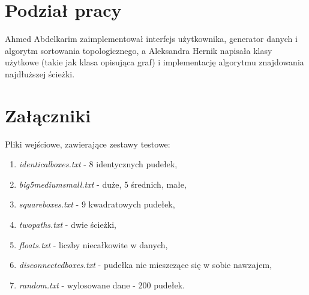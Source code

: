 \documentclass{article}
\begin{document}
\section{Podział pracy}
Ahmed Abdelkarim zaimplementował interfejs użytkownika, generator danych i algorytm sortowania topologicznego, a Aleksandra Hernik napisała klasy użytkowe (takie jak klasa opisująca graf) i implementację algorytmu znajdowania najdłuższej ścieżki.

\section{Załączniki}
Pliki wejściowe, zawierające zestawy testowe:
\begin{enumerate}
\item \textit{identical\textunderscore boxes.txt} - 8 identycznych pudełek,
\item \textit{big\textunderscore 5medium\textunderscore small.txt} - duże, 5 średnich, małe,
\item \textit{square\textunderscore boxes.txt} - 9 kwadratowych pudełek,
\item \textit{two\textunderscore paths.txt} - dwie ścieżki,
\item \textit{floats.txt} - liczby niecałkowite w danych,
\item \textit{disconnected\textunderscore boxes.txt} - pudełka nie mieszczące się w sobie nawzajem,
\item \textit{random.txt} - wylosowane dane - 200 pudełek.

\end{enumerate}
\end{document}
